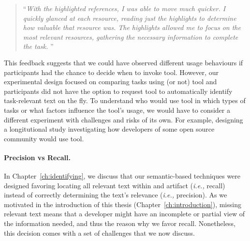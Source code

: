 \begin{footnotesize}
\begin{quote}
    ``\textit{With the highlighted references, I was able to move much quicker. I quickly glanced at each resource, reading just the highlights to determine how valuable that resource was. The highlights allowed me to focus on the most relevant resources, gathering the necessary information to complete the task. 
}''
\end{quote}
\end{footnotesize}





\smallskip
This feedback suggests that we could have observed different usage behaviours if participants had the chance to decide when to invoke \acs{tool}.
However, 
our experimental design focused on comparing tasks using (or not) \acs{tool} and participants did not have the option to 
request \acs{tool} to automatically identify task-relevant text on the fly. 
To understand who would use  \acs{tool} in which types of tasks or 
what factors  influence the tool's usage,
we would have to consider a different experiment with challenges and risks of its own.
For example, designing a longitutional study investigating how developers 
of some open source community would use \acs{tool}.







\paragraph{\textbf{Precision vs Recall.}}

In Chapter~\ref{ch:identifying}, we discuss that our semantic-based techniques were designed favoring locating all relevant text within and
artifact (\textit{i.e.,} recall) instead of 
correctly determining the text's relevance (\textit{i.e.,} precision). 
As we motivated in the introduction of this thesis (Chapter~\ref{ch:introduction}),
missing relevant text means that a developer might have an incomplete or partial view of the information needed,
and thus the reason why we favor recall. 
Nonetheless, this decision comes with a set of challenges that we now discuss.


